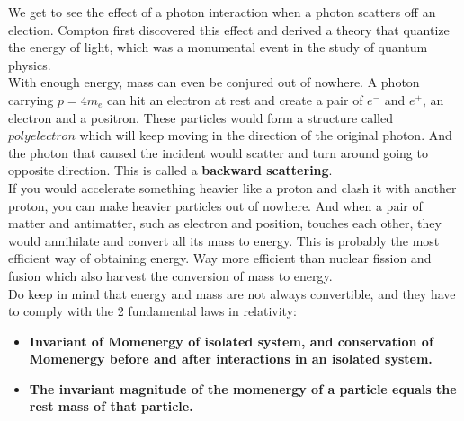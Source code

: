 \documentclass[12pt]{book}
\begin{document}
We get to see the effect of a photon interaction when a photon scatters off an election. Compton first discovered this effect and derived a theory that quantize the energy of light, which was a monumental event in the study of quantum physics.\\
\newline
With enough energy, mass can even be conjured out of nowhere. A photon carrying $p=4m_e$ can hit an electron at rest and create a pair of $e^-$ and $e^+$, an electron and a positron. These particles would form a structure called $polyelectron$ which will keep moving in the direction of the original photon. And the photon that caused the incident would scatter and turn around going to opposite direction. This is called a \textbf{backward scattering}. \\
\newline
If you would accelerate something heavier like a proton and clash it with another proton, you can make heavier particles out of nowhere. And when a pair of matter and antimatter, such as electron and position, touches each other, they would annihilate and convert all its mass to energy. This is probably the most efficient way of obtaining energy. Way more efficient than nuclear fission and fusion which also harvest the conversion of mass to energy. \\
\newline
Do keep in mind that energy and mass are not always convertible, and they have to comply with the 2 fundamental laws in relativity:
\begin{itemize}
    \item \textbf{Invariant of Momenergy of isolated system, and conservation of Momenergy before and after interactions in an isolated system.}
    \item \textbf{The invariant magnitude of the momenergy of a particle equals the rest mass of that particle. }
\end{itemize}
\end{document}
